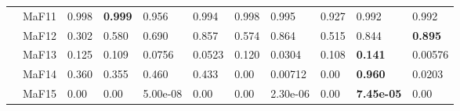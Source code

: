 \documentclass[]{article}
\begin{document}
\begin{landscape}
\begin{table}
\begin{footnotesize}
\begin{tabular}{|l|l|l|l|l|l|l|l|l|l|l|}
 & MaF11 & \cellcolor{gray95} 0.998 & \cellcolor{gray95} {\bf 0.999} & 0.956 & 0.994 & \cellcolor{gray95} 0.998 & 0.995 & 0.927 & 0.992 & 0.992\\
 & MaF12 & 0.302 & 0.580 & 0.690 & \cellcolor{gray95} 0.857 & 0.574 & \cellcolor{gray95} 0.864 & 0.515 & \cellcolor{gray95} 0.844 & \cellcolor{gray95} {\bf 0.895}\\
 & MaF13 & \cellcolor{gray95} 0.125 & 0.109 & 0.0756 & 0.0523 & \cellcolor{gray95} 0.120 & 0.0304 & 0.108 & \cellcolor{gray95} {\bf 0.141} & 0.00576\\
 & MaF14 & 0.360 & 0.355 & \cellcolor{gray95} 0.460 & \cellcolor{gray95} 0.433 & 0.00 & 0.00712 & 0.00 & \cellcolor{gray95} {\bf 0.960} & 0.0203\\
 & MaF15 & 0.00 & 0.00 & 5.00e-08 & 0.00 & 0.00 & 2.30e-06 & 0.00 & \cellcolor{gray95} {\bf 7.45e-05} & 0.00\\
\hline


\end{tabular}
\end{footnotesize}
\end{table}
\end{landscape}
\end{document}

